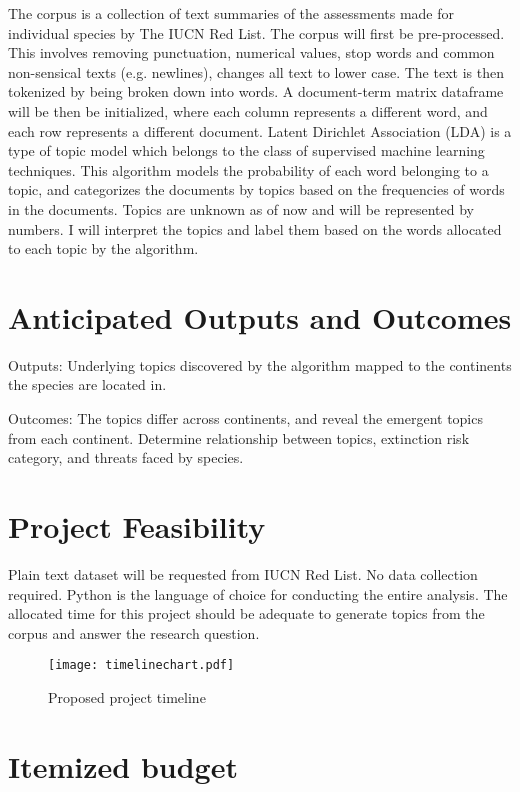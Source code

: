 \documentclass[11pt, a4paper, titlepage]{article}
\begin{document}
\noindent The corpus is a collection of text summaries of the assessments made for individual species by The IUCN Red List. The corpus will first be pre-processed. This involves removing punctuation, numerical values, stop words and common non-sensical texts (e.g. newlines), changes all text to lower case. The text is then tokenized by being broken down into words. A document-term matrix dataframe will be then be initialized, where each column represents a different word, and each row represents a different document. Latent Dirichlet Association (LDA) is a type of topic model which belongs to the class of supervised machine learning techniques. This algorithm models the probability of each word belonging to a topic, and categorizes the documents by topics based on the frequencies of words in the documents. Topics are unknown as of now and will be represented by numbers. I will interpret the topics and label them based on the words allocated to each topic by the algorithm.

\section{Anticipated Outputs and Outcomes}

\noindent Outputs: Underlying topics discovered by the algorithm mapped to the continents the species are located in. 

\noindent Outcomes: The topics differ across continents, and reveal the emergent topics from each continent. Determine relationship between topics, extinction risk category, and threats faced by species.

\section{Project Feasibility}

\noindent Plain text dataset will be requested from IUCN Red List. No data collection required. Python is the language of choice for conducting the entire analysis. The allocated time for this project should be adequate to generate topics from the corpus and answer the research question.

\begin{figure}[h!]
    \centering\texttt{[image: timelinechart.pdf]}
    \caption{Proposed project timeline}
\end{figure}

\section{Itemized budget}
\end{document}
